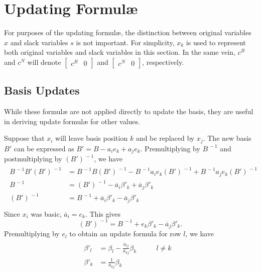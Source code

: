 \section{Updating Formul\ae}
\label{sec:UpdatingFormulas}

For purposes of the updating formul\ae, the distinction between original
variables $x$ and slack variables $s$ is not important.
For simplicity, $x_k$ is used to represent both original variables and slack
variables in this section.
In the same vein, $c^B$ and $c^N$ will denote
$\begin{bmatrix} c^B & 0 \end{bmatrix}$ and
$\begin{bmatrix} c^N & 0 \end{bmatrix}$, respectively.

\subsection{Basis Updates}
\label{sec:BasisUpdates}

While these formul\ae{} are not applied directly to update the basis, they are
useful in deriving update formul\ae{} for other values.

Suppose that $x_i$ will leave basis position $k$ and be replaced by $x_j$.
The new basis $B'$ can be expressed as $B' = B - a_i e_k + a_j e_k$.
Premultiplying by $B^{\,-1}$ and postmultiplying by $(B')^{\,-1}$, we have
\begin{align}
\begin{split}\label{Eqn:BasisUpdate}
B^{\,-1}B'(B')^{\,-1} & = B^{\,-1}B(B')^{\,-1} -
			  B^{\,-1}a_i e_k(B')^{\,-1} +
			  B^{\,-1}a_j e_k(B')^{\,-1} \\
B^{\,-1} & = (B')^{\,-1} - \overline{a}_i \beta'_k + \overline{a}_j \beta'_k \\
(B')^{\,-1} & = B^{\,-1} + \overline{a}_i \beta'_k - \overline{a}_j \beta'_k \\
\end{split}
\end{align}
Since $x_i$ was basic, $\overline{a}_i = e_k$. This gives
\begin{equation*}
(B')^{\,-1} = B^{\,-1} + e_k\beta'_k - \overline{a}_{j} \beta'_k.
\end{equation*}
Premultiplying by $e_l$ to obtain an update formula for row $l$, we have
\begin{align}
\begin{alignedat}{2}
\beta'_l & = \beta_l - \frac{\overline{a}_{lj}}{\overline{a}_{kj}}\beta_k &
	\qquad l \neq k & \\
\beta'_k & = \frac{1}{\overline{a}_{kj}}\beta_k 
\end{alignedat} \label{Eqn:betaupdate}
\end{align}

